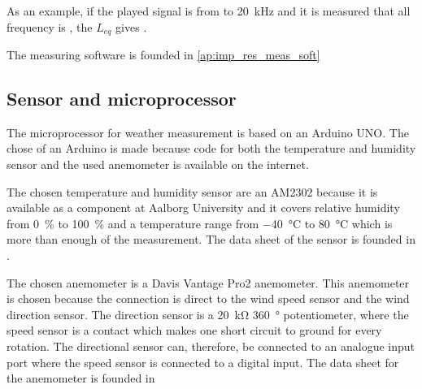 \startexplain
{}
\stopexplain

As an example, if the played signal is from  to \SI{20}{\kilo\hertz} and it is measured that all frequency is , the $L_{eq}$ gives .

The measuring software is founded in  \autoref{ap:imp_res_meas_soft}


\subsection{Sensor and microprocessor}\label{des:sensor_mic}
The microprocessor for weather measurement is based on an Arduino UNO. The chose of an Arduino is made because code for both the temperature and humidity sensor and the used anemometer is available on the internet.  

The chosen temperature and humidity sensor are an AM2302 because it is available as a component at Aalborg University and it covers relative humidity from \SI{0}{\percent} to \SI{100}{\percent} and a temperature range from \SI{-40}{\celsius} to \SI{80}{\celsius} which is more than enough of the measurement. The data sheet of the sensor is founded in \citep{temp_sens}.


The chosen anemometer is a Davis Vantage Pro2 anemometer. This anemometer is chosen because the connection is direct to the wind speed sensor and the wind direction sensor. The direction sensor is a \SI{20}{\kilo\ohm} \SI{360}{\degree} potentiometer, where the speed sensor is a contact which makes one short circuit to ground for every rotation. The directional sensor can, therefore, be connected to an analogue input port where the speed sensor is connected to a digital input. The data sheet for the anemometer is founded in \citep{anemometer_sens}



